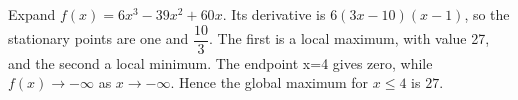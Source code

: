 Expand $f(x)=6x^3-39x^2+60x$. Its derivative is $6(3x-10)(x-1)$, so the stationary points are one and $\dfrac{10}{3}$. The first is a local maximum, with value 27, and the second a local minimum. The endpoint x=4 gives zero, while $f(x)\to-\infty$ as $x\to-\infty$. Hence the global maximum for $x\le4$ is $\boxed{27}$.
